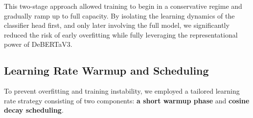 \vspace{1.5em}
This two-stage approach allowed training to begin in a conservative regime and gradually ramp up to full capacity. By isolating the learning dynamics of the classifier head first, and only later involving the full model, we significantly reduced the risk of early overfitting while fully leveraging the representational power of \ac{DeBERTaV3}.








\subsection{Learning Rate Warmup and Scheduling}

To prevent overfitting and training instability, we employed a tailored learning rate strategy consisting of two components: \textbf{a short warmup phase} and \textbf{cosine decay scheduling}.

